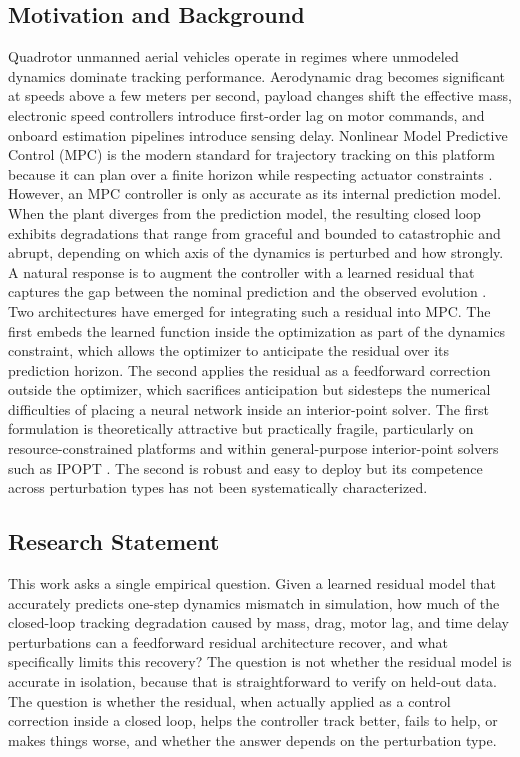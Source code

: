 \documentclass[conference]{IEEEtran}
\begin{document}
\subsection{Motivation and Background}
Quadrotor unmanned aerial vehicles operate in regimes where unmodeled dynamics dominate tracking performance. Aerodynamic drag becomes significant at speeds above a few meters per second, payload changes shift the effective mass, electronic speed controllers introduce first-order lag on motor commands, and onboard estimation pipelines introduce sensing delay. Nonlinear Model Predictive Control (MPC) is the modern standard for trajectory tracking on this platform because it can plan over a finite horizon while respecting actuator constraints \cite{faessler2018differential, torrente2021data, salzmann2023real}. However, an MPC controller is only as accurate as its internal prediction model. When the plant diverges from the prediction model, the resulting closed loop exhibits degradations that range from graceful and bounded to catastrophic and abrupt, depending on which axis of the dynamics is perturbed and how strongly.
A natural response is to augment the controller with a learned residual that captures the gap between the nominal prediction and the observed evolution \cite{saviolo2023learning, torrente2021data, hewing2020learning}. Two architectures have emerged for integrating such a residual into MPC. The first embeds the learned function inside the optimization as part of the dynamics constraint, which allows the optimizer to anticipate the residual over its prediction horizon. The second applies the residual as a feedforward correction outside the optimizer, which sacrifices anticipation but sidesteps the numerical difficulties of placing a neural network inside an interior-point solver. The first formulation is theoretically attractive but practically fragile, particularly on resource-constrained platforms and within general-purpose interior-point solvers such as IPOPT \cite{wachter2006implementation, andersson2019casadi}. The second is robust and easy to deploy but its competence across perturbation types has not been systematically characterized.

\subsection{Research Statement}
This work asks a single empirical question. Given a learned residual model that accurately predicts one-step dynamics mismatch in simulation, how much of the closed-loop tracking degradation caused by mass, drag, motor lag, and time delay perturbations can a feedforward residual architecture recover, and what specifically limits this recovery? The question is not whether the residual model is accurate in isolation, because that is straightforward to verify on held-out data. The question is whether the residual, when actually applied as a control correction inside a closed loop, helps the controller track better, fails to help, or makes things worse, and whether the answer depends on the perturbation type.
\end{document}
